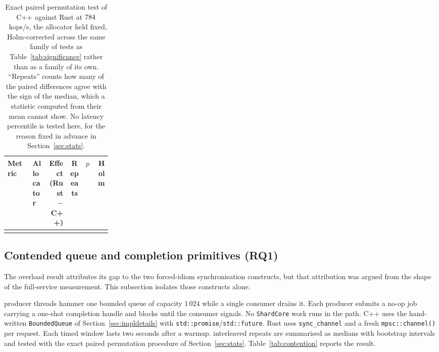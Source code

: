 \documentclass[english,twoside,openright,a4paper,censored,csm,software-track-2020]{HYthesisML}
\begin{document}
\begin{table}[H]
\centering
\small
\caption[Exact paired test past saturation]{Exact paired permutation test of C++ against Rust at
$784$~kops/s, the allocator held fixed, Holm-corrected across the same family of
\NTests{} tests as Table~\ref{tab:significance} rather than as a family of its own. ``Repeats''
counts how many of the \NRepeats{} paired differences agree with the sign of the median, which a
statistic computed from their mean cannot show. No latency percentile is tested here, for the
reason fixed in advance in Section~\ref{sec:stats}.\label{tab:overloadtest}}
\setlength{\tabcolsep}{4pt}
\begin{tabular}{@{}p{0.24\linewidth} l r c r r@{}}
\hline\hline
Metric & Allocator & Effect (Rust $-$ C++) & Repeats & $p$ & Holm \\
\hline
\\
\hline
\end{tabular}
\end{table}

\subsection{Contended queue and completion primitives (RQ1)}\label{sec:contention}
The overload result attributes its gap to the two forced-idiom synchronisation constructs, but
that attribution was argued from the shape of the full-service measurement. This subsection
isolates those constructs alone.

\ContentionProducers{} producer threads hammer one bounded queue of capacity $1\,024$ while a
single consumer drains it. Each producer submits a no-op job carrying a one-shot completion handle and blocks
until the consumer signals. No \texttt{ShardCore} work runs in the path. C++ uses the
hand-written \texttt{BoundedQueue} of Section~\ref{sec:impldetails} with
\texttt{std::promise}/\texttt{std::future}. Rust uses \texttt{sync\_channel} and a fresh
\texttt{mpsc::channel()} per request. Each timed window lasts two seconds after a warmup.
\ContentionRepeats{} interleaved repeats are summarised as medians with bootstrap intervals and
tested with the exact paired permutation procedure of Section~\ref{sec:stats}.
Table~\ref{tab:contention} reports the result.
\end{document}
